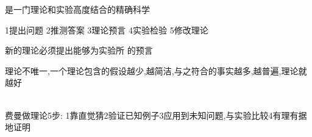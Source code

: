\documentclass{leptc}
\begin{document}
是一门理论和实验高度结合的精确科学

\N1提出问题
\N2推测答案
\N3理论预言
\N4实验检验
\N5修改理论

新的理论必须提出能够为实验所  的预言

理论不唯一,一个理论包含的假设越少,越简洁,与之符合的事实越多,越普遍,理论就越好


\ \\

费曼做理论5步:
\N1靠直觉猜\N2验证已知例子\N3应用到未知问题,与实验比较\N4有理有据地证明

\end{document}
